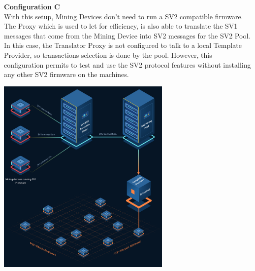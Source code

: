 \begin{itemize}
    \begin{minipage}{.40\textwidth}
    \item \textbf{Configuration C}\label{configC}\\
    With this setup, Mining Devices don't need to run a SV2 compatible firmware. The Proxy which is used to let for efficiency, is also able to translate the SV1 messages that come from the Mining Device into SV2 messages for the SV2 Pool. In this case, the Translator Proxy is not configured to talk to a local Template Provider, so transactions selection is done by the pool. However, this configuration permits to test and use the SV2 protocol features without installing any other SV2 firmware on the machines.
    \end{minipage}
    \hspace{0.25cm}
    \begin{minipage}{.60\textwidth}
    \includegraphics[width=8.5cm]{Figures/sri/SRI_configC.png}
    \label{fig:SRI_configC}
    \end{minipage}


\end{itemize}
